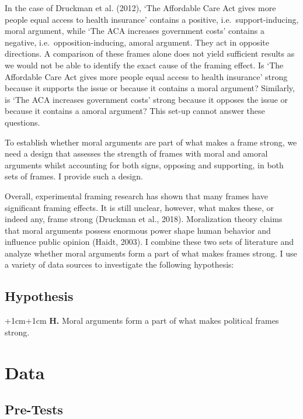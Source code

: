 \documentclass[12pt,econ]{sources/authesis}
\begin{document}
In the case of Druckman et al. (2012), `The Affordable Care Act gives more people equal access to health insurance' contains a positive, i.e.~support-inducing, moral argument, while `The ACA increases government costs' contains a negative, i.e.~opposition-inducing, amoral argument. They act in opposite directions. A comparison of these frames alone does not yield sufficient results as we would not be able to identify the exact cause of the framing effect. Is `The Affordable Care Act gives more people equal access to health insurance' strong because it supports the issue or because it contains a moral argument? Similarly, is `The ACA increases government costs' strong because it opposes the issue or because it contains a amoral argument? This set-up cannot answer these questions.

To establish whether moral arguments are part of what makes a frame strong, we need a design that assesses the strength of frames with moral and amoral arguments whilst accounting for both signs, opposing and supporting, in both sets of frames. I provide such a design.

Overall, experimental framing research has shown that many frames have significant framing effects. It is still unclear, however, what makes these, or indeed any, frame strong (Druckman et al., 2018). Moralization theory claims that moral arguments possess enormous power shape human behavior and influence public opinion (Haidt, 2003). I combine these two sets of literature and analyze whether moral arguments form a part of what makes frames strong. I use a variety of data sources to investigate the following hypothesis:

\hypertarget{framing-theory-hypothesis}{%
\subsection{Hypothesis}\label{framing-theory-hypothesis}}

\vspace{0.3cm}
\begin{adjustwidth*}{+1cm}{+1cm}
\textbf{H.} Moral arguments form a part of what makes political frames strong.
\end{adjustwidth*}
\hypertarget{framing-data}{%
\section{Data}\label{framing-data}}

\hypertarget{framing-data-pre_test}{%
\subsection{Pre-Tests}\label{framing-data-pre_test}}
\end{document}
